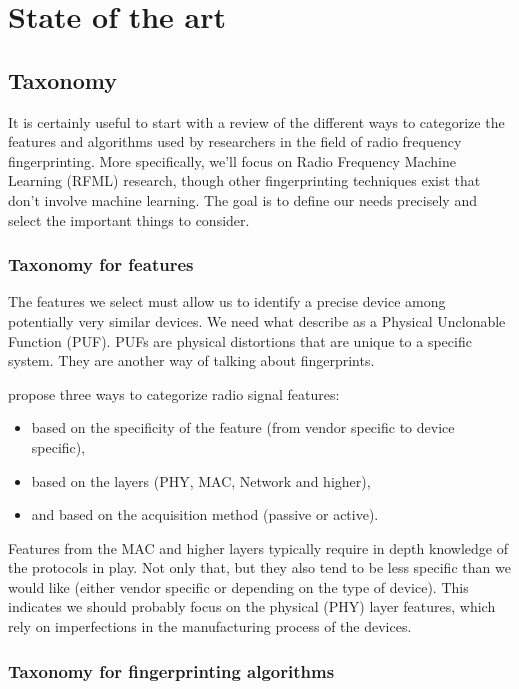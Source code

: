 \section{State of the art} \label{sota}

\subsection{Taxonomy}

It is certainly useful to start with a review of the different ways to categorize the features and algorithms used by researchers in the field of radio frequency fingerprinting. More specifically, we'll focus on Radio Frequency Machine Learning (RFML) research, though other fingerprinting techniques exist that don't involve machine learning. The goal is to define our needs precisely and select the important things to consider.

\subsubsection{Taxonomy for features} \label{features_tax}

The features we select must allow us to identify a precise device among potentially very similar devices. We need what \textcite{delgado_passive_2020} describe as a Physical Unclonable Function (PUF). PUFs are physical distortions that are unique to a specific system. They are another way of talking about fingerprints.

\textcite{xu_device_2015} propose three ways to categorize radio signal features:

\begin{itemize}
  \item based on the specificity of the feature (from vendor specific to device specific),
  \item based on the layers (PHY, MAC, Network and higher),
  \item and based on the acquisition method (passive or active).
\end{itemize}

Features from the MAC and higher layers typically require in depth knowledge of the protocols in play. Not only that, but they also tend to be less specific than we would like (either vendor specific or depending on the type of device). This indicates we should probably focus on the physical (PHY) layer features, which rely on imperfections in the manufacturing process of the devices.

\subsubsection{Taxonomy for fingerprinting algorithms} \label{algo-taxo}

